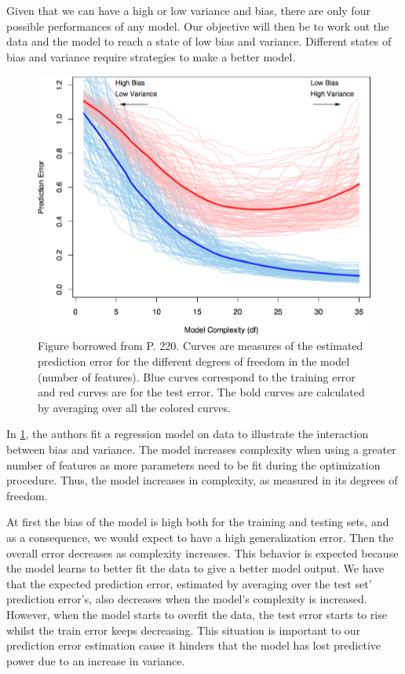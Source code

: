 Given that we can have a high or low variance and bias, there are only four possible performances of any model. Our objective will then be to work out the data and the model to reach a state of low bias and variance. Different states of bias and variance require strategies to make a better model.



\begin{figure}[h!]
\begin{center}
\includegraphics[width=0.7\columnwidth]{figures/figure-biasVariance/figure-biasVariance}
\caption{\label{figure-biasVariance} Figure borrowed from \protect\textcite{hastie-elemstatslearn} P. 220. Curves are measures of the estimated prediction error for the different degrees of freedom in the model (number of features). Blue curves correspond to the training error and red curves are for the test error. The bold curves are calculated by averaging over all the colored curves.%
}
\end{center}
\end{figure}

In \ref{figure-biasVariance}, the authors fit a regression model on data to illustrate the interaction between bias and variance. The model increases complexity when using a greater number of features as more parameters need to be fit during the optimization procedure. Thus, the model increases in complexity, as measured in its degrees of freedom.

At first the bias of the model is high both for the training and testing sets, and as a consequence, we would expect to have a high generalization error. Then the overall error decreases as complexity increases. This behavior is expected because the model learns to better fit the data to give a better model output. We have that the expected prediction error, estimated by averaging over the test set' prediction error's, also decreases when the model's complexity is increased. However, when the model starts to overfit the data, the test error starts to rise whilst the train error keeps decreasing. This situation is important to our prediction error estimation cause it hinders that the model has lost predictive power due to an increase in variance.

